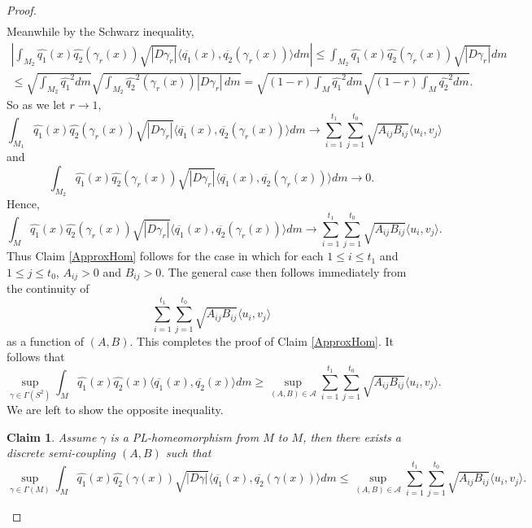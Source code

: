 \documentclass[final,hidelinks,onefignum,onetabnum]{siamart220329}
\newtheorem{claim}{Claim}
\begin{document}
\begin{proof}
\begin{multline*}
\end{multline*}
Meanwhile by the Schwarz inequality,
\begin{multline*}
\left|\int_{M_2}\hat{q_1}(x)\hat{q_2}(\gamma_r(x))\sqrt{|D\gamma_r|}\langle\overline{q_1}(x),\overline{q_2}(\gamma_r(x))\rangle dm\right|
\leq\int_{M_2}\hat{q_1}(x)\hat{q_2}(\gamma_r(x))\sqrt{|D\gamma_r|} dm\\
\leq\sqrt{\int_{M_2}\hat{q_1}^2dm}\sqrt{\int_{M_2}\hat{q_2}^2(\gamma_r(x))|D\gamma_r|\,dm}
=\sqrt{(1-r)\int_{M}\hat{q_1}^2dm }\sqrt{(1-r)\int_{M}\hat{q_2}^2dm }.
\end{multline*}
So as we let $r\to 1$,
\begin{equation*}
    \int_{M_1}\hat{q_1}(x)\hat{q_2}(\gamma_r(x))\sqrt{|D\gamma_r|}\langle\overline{q_1}(x),\overline{q_2}(\gamma_r(x))\rangle dm \to\sum\limits_{i=1}^{t_1}\sum_{j=1}^{t_0}\sqrt{A_{ij}B_{ij}}\langle u_i,v_j\rangle
\end{equation*}
and
\begin{equation*}
\int_{M_2}\hat{q_1}(x)\hat{q_2}(\gamma_r(x))\sqrt{|D\gamma_r|}\langle\overline{q_1}(x),\overline{q_2}(\gamma_r(x))\rangle dm \to 0.
\end{equation*}
Hence, 
\begin{equation*}
    \int_{M}\hat{q_1}(x)\hat{q_2}(\gamma_r(x))\sqrt{|D\gamma_r|}\langle\overline{q_1}(x),\overline{q_2}(\gamma_r(x))\rangle dm \to\sum\limits_{i=1}^{t_1}\sum_{j=1}^{t_0}\sqrt{A_{ij}B_{ij}}\langle u_i,v_j\rangle. 
\end{equation*}Thus Claim \ref{ApproxHom} follows for the case in which for each $1\leq i\leq t_1$ and $1\leq j\leq t_0$, $A_{ij}>0$ and $B_{ij}>0$. The general case then follows immediately from the continuity of
\begin{equation*}
    \sum\limits_{i=1}^{t_1}\sum_{j=1}^{t_0}\sqrt{A_{ij}B_{ij}}\langle u_i,v_j\rangle
\end{equation*} as a function of $(A,B)$.
This completes the proof of Claim \ref{ApproxHom}. It follows that \begin{equation*}
  \sup_{\gamma \in \Gamma(S^2)}\int_M \hat{q_1}(x)\hat{q_2}(x)\langle\overline{q_1}(x),\overline{q_2}(x)\rangle dm\geq\sup_{(A,B)\in\mathcal{A}}\sum_{i=1}^{t_1}\sum_{j=1}^{t_0}\sqrt{A_{ij}B_{ij}}\langle u_i,v_j\rangle .
\end{equation*}
We are left to show the opposite inequality.
\begin{claim}\label{maintheoremclaim3}
 Assume $\gamma$ is a PL-homeomorphism from $M$ to $M$, then there exists a discrete semi-coupling $(A,B)$ such that \begin{equation*} \sup_{\gamma \in \Gamma(M)}\int_M\hat{q_1}(x)\hat{q_2}(\gamma(x))\sqrt{|D\gamma|}\langle\overline{q_1}(x),\overline{q_2}(\gamma(x))\rangle dm\leq\sup_{(A,B)\in\mathcal{A}}\sum_{i=1}^{t_1}\sum_{j=1}^{t_0}\sqrt{A_{ij}B_{ij}}\langle u_i,v_j\rangle .\end{equation*}

\end{claim}
\end{proof}
\end{document}

